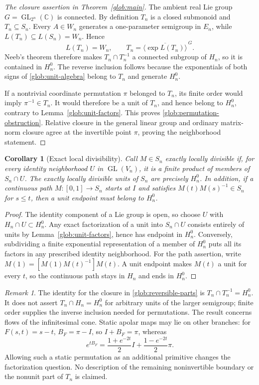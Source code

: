 \documentclass[reqno]{amsart}
\newtheorem{corollary}[theorem]{Corollary}
\theoremstyle{definition}
\theoremstyle{remark}
\newtheorem{remark}[theorem]{Remark}
\newcommand{\C}{\mathbb C}
\begin{document}
\begin{proof}[The closure assertion in Theorem~\ref{glob:main}]
The ambient real Lie group $G=\operatorname{GL}_{2^n}(\C)$ is connected.
By definition $T_n$ is a closed submonoid and $T_n\subseteq S_n$.
Every $A\in W_n$ generates a one-parameter semigroup in $E_n$, while
$L(T_n)\subseteq L(S_n)=W_n$. Hence
\[
 L(T_n)=W_n,\qquad
 T_n=\overline{\langle\exp L(T_n)\rangle}^{\,G}.
\]
Neeb's theorem therefore makes $T_n\cap T_n^{-1}$ a connected
subgroup of $H_n$, so it is contained in $H_n^0$.
The reverse inclusion follows because the exponentials of both signs of
\eqref{glob:unit-algebra} belong to $T_n$ and generate $H_n^0$.

If a nontrivial coordinate permutation $\pi$ belonged to $T_n$, its
finite order would imply $\pi^{-1}\in T_n$.  It would therefore be
a unit of $T_n$, and hence belong to $H_n^0$, contrary to
Lemma~\ref{glob:unit-factors}.  This proves
\eqref{glob:permutation-obstruction}.  Relative closure in the general
linear group and ordinary matrix-norm closure agree at the invertible
point $\pi$, proving the neighborhood statement.
\end{proof}

\begin{corollary}[Exact local divisibility]\label{glob:local-divisibility}
Call $M\in S_n$ exactly locally divisible if, for every identity
neighborhood $U$ in $\operatorname{GL}(V_n)$, it is a finite product
of members of $S_n\cap U$.  The exactly locally divisible units of
$S_n$ are precisely $H_n^0$.  In addition, if a continuous path
$M:[0,1]\to S_n$ starts at $I$ and satisfies
$M(t)M(s)^{-1}\in S_n$ for $s\leq t$, then a unit endpoint must
belong to $H_n^0$.
\end{corollary}

\begin{proof}
The identity component of a Lie group is open, so choose $U$ with
$H_n\cap U\subset H_n^0$.  Any exact factorization of a unit into
$S_n\cap U$ consists entirely of units by
Lemma~\ref{glob:unit-factors}, hence has endpoint in $H_n^0$.
Conversely, subdividing a finite exponential representation of a member
of $H_n^0$ puts all its factors in any prescribed identity neighborhood.
For the path assertion, write
$M(1)=[M(1)M(t)^{-1}]M(t)$.  A unit endpoint makes $M(t)$ a unit
for every $t$, so the continuous path stays in $H_n$ and ends in
$H_n^0$.
\end{proof}

\begin{remark}\label{glob:scope}
The identity for the closure in \eqref{glob:reversible-parts} is
$T_n\cap T_n^{-1}=H_n^0$.  It does not assert
$T_n\cap H_n=H_n^0$ for arbitrary units of the larger semigroup;
finite order supplies the inverse inclusion needed for permutations.
The result concerns flows of the infinitesimal cone.  Static apolar maps
may lie on other branches: for $F(s,t)=s-t$,
$B_F=\pi-I$, so $I+B_F=\pi$, whereas
\[
 e^{tB_F}=\frac{1+e^{-2t}}2I+\frac{1-e^{-2t}}2\pi.
\]
Allowing such a static permutation as an additional primitive changes
the factorization question.  No description of the remaining
noninvertible boundary or the nonunit part of $T_n$ is claimed.
\end{remark}
\end{document}
